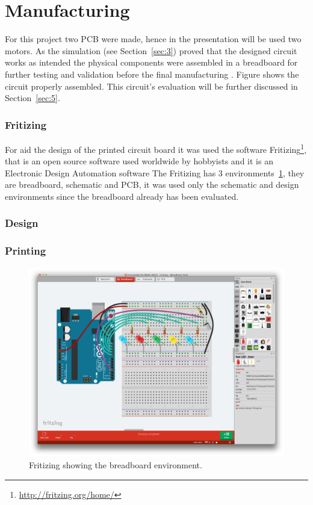 \section{\textbf{Manufacturing}}\label{sec:4}
    For this project two PCB were made, hence in the presentation will be used two motors.
    As the simulation (see Section~\ref{sec:3}) proved that the designed circuit works as intended the physical components were assembled in a breadboard for further testing and validation before the final manufacturing . Figure shows the circuit properly assembled. This circuit's evaluation will be further discussed in Section~\ref{sec:5}.

    \subsubsection{Fritizing} %
    \label{ssub:fritizing}
        For aid the design of the printed circuit board it was used the software Fritizing\footnote{\url{http://fritzing.org/home/}}, that is an open source software used worldwide by hobbyists and it is an Electronic Design Automation software
        The Fritizing has 3 environments~\ref{fig:breadboard}, they are breadboard, schematic and PCB, it was used only the schematic and design environments since the breadboard already has been evaluated.

    \subsubsection{Design} %
    \label{ssub:printing}


    \subsubsection{Printing} %
    \label{ssub:printing}
    
	
\begin{figure}[t]
\centering
\centering%
\includegraphics[height=.40\textwidth]{img/FritzingBreadBoard.png}
\caption{Fritizing showing the breadboard environment.}
\label{fig:breadboard}%
\end{figure}
